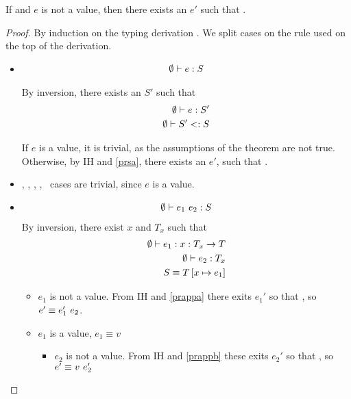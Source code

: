 
\begin{theorem}[Progress]
	If  and $e$ is not a value, 
	then there exists an $e'$ such that .
\end{theorem}
	
\begin{proof}
By induction on the typing derivation .
We split cases on the rule used on the top of the derivation.

\begin{itemize}
	\item\tsub 

\begin{align*}
{\emptyset}\vdash {e}:{S}
\end{align*}

By inversion, there exists an $S'$ such that 
\begin{align}
{\emptyset}\vdash {e}:{S'} 	\label{prsa}\\
{\emptyset}\vdash {S'}<:{S}		\label{prsb}
\end{align}

If $e$ is a value, it is trivial, as the assumptions of the theorem are not true.
Otherwise, by IH and \ref{prsa}, there exists an $e'$, such that .


\item	{}, 
		, 
		\tcon, 
		,
		\tgen\
cases are trivial, since $e$ is a value.


\item {}
\begin{align*}
{\emptyset}\vdash {\ensuremath{{e_1} \ {e_2}}}:{S} 
\end{align*}
By inversion, there exist $x$ and $T_x$ such that 
\begin{align}
{\emptyset}\vdash {e_1}:{x : T_x \rightarrow T} 		\label{prappa}\\
{\emptyset}\vdash {e_2}:{T_x}					\label{prappb}\\
S \equiv T\left[ x \mapsto e_1 \right]					\label{prappc}
\end{align}

\begin{itemize}
	\item $e_1$ is not a value.
	From IH and \ref{prappa}
	there exits $e_1'$ so that , so $e' \equiv {e_1'} \ {e_2}$.

	\item $e_1$ is a value, $e_1 \equiv v$
	\begin{itemize}
		\item $e_2$ is not a value.
		From IH and \ref{prappb} these exits $e_2'$ so that , 
		so $e' \equiv {v} \ {e_2'}$
		

\end{itemize}
\end{itemize}
\end{itemize}
\end{proof}
